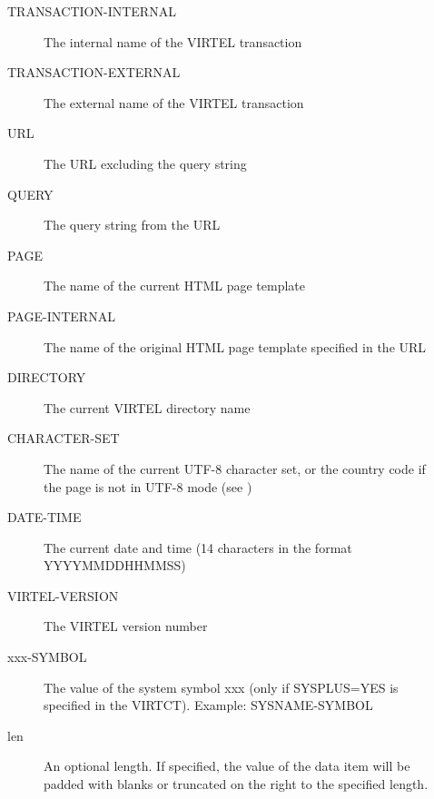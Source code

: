 \documentclass[letterpaper,10pt,english]{sphinxmanual}
\begin{document}
\begin{description}
\begin{description}
\begin{description}
\begin{itemize}
\end{itemize}

\end{description}

\item[{TRANSACTION-INTERNAL}] \leavevmode
The internal name of the VIRTEL transaction

\item[{TRANSACTION-EXTERNAL}] \leavevmode
The external name of the VIRTEL transaction

\item[{URL}] \leavevmode
The URL excluding the query string

\item[{QUERY}] \leavevmode
The query string from the URL

\item[{PAGE}] \leavevmode
The name of the current HTML page template

\item[{PAGE-INTERNAL}] \leavevmode
The name of the original HTML page template specified in the URL

\item[{DIRECTORY}] \leavevmode
The current VIRTEL directory name

\item[{CHARACTER-SET}] \leavevmode
The name of the current UTF-8 character set, or the country code if the page is not in UTF-8 mode (see {\hyperref[\detokenize{User_Guide:v457ug-ebcdic-translation}]{}})

\item[{DATE-TIME}] \leavevmode
The current date and time (14 characters in the format YYYYMMDDHHMMSS)

\item[{VIRTEL-VERSION}] \leavevmode
The VIRTEL version number

\item[{xxx-SYMBOL}] \leavevmode
The value of the system symbol xxx (only if SYSPLUS=YES is specified in the VIRTCT). Example: SYSNAME-SYMBOL

\item[{len}] \leavevmode
An optional length. If specified, the value of the data item will be padded with blanks or truncated on the right to the specified length.

\end{description}

\end{description}
\end{document}
